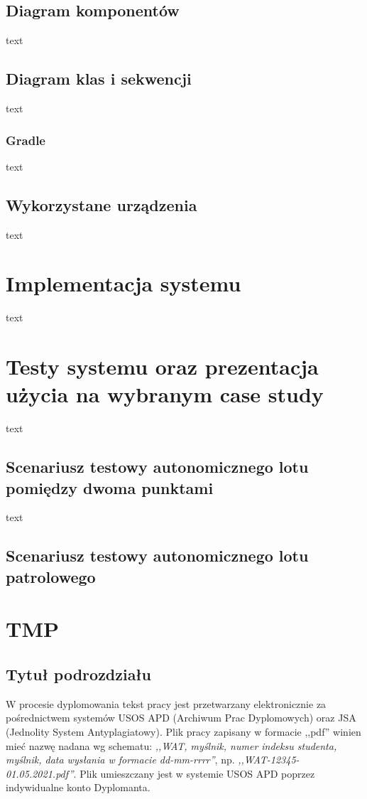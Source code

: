 \subsection{Diagram komponentów}
\hspace{1cm}text
\subsection{Diagram klas i sekwencji}
\hspace{1cm}text
\subsubsection{Gradle}
\hspace{1cm}text
\subsection{Wykorzystane urządzenia}
\hspace{1cm}text

\newpage
\section{Implementacja systemu}
\hspace{1cm}text

\newpage
\section{Testy systemu oraz prezentacja użycia na wybranym case study}
\hspace{1cm}text
\subsection{Scenariusz testowy autonomicznego lotu pomiędzy dwoma punktami}
\hspace{1cm}text
\subsection{Scenariusz testowy autonomicznego lotu patrolowego}

\newpage
\section{TMP}

\subsection{Tytuł podrozdziału}
W procesie dyplomowania tekst pracy jest przetwarzany elektronicznie za pośrednictwem systemów USOS APD (Archiwum Prac Dyplomowych) oraz JSA (Jednolity System Antyplagiatowy). Plik pracy zapisany w formacie ,,pdf'' winien mieć nazwę nadana wg schematu: \textit{,,WAT, myślnik, numer indeksu studenta, myślnik, data wysłania w formacie dd-mm-rrrr''}, np. \textit{,,WAT-12345-01.05.2021.pdf''}. Plik umieszczany jest w systemie USOS APD poprzez indywidualne konto Dyplomanta.

